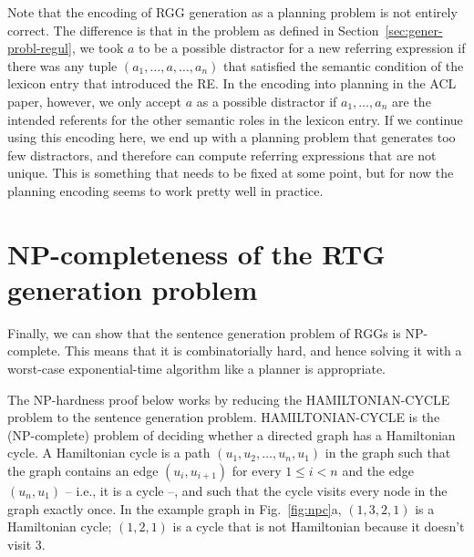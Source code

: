 \documentclass[11pt,a4]{article}
\theoremstyle{plain}
\theoremstyle{definition}
\begin{document}
Note that the encoding of RGG generation as a planning problem is not
entirely correct.  The difference is that in the problem as defined in
Section~\ref{sec:gener-probl-regul}, we took $a$ to be a possible
distractor for a new referring expression if there was any tuple
$(a_1,\ldots,a,\ldots,a_n)$ that satisfied the semantic condition of
the lexicon entry that introduced the RE.  In the encoding into
planning in the ACL paper, however, we only accept $a$ as a possible
distractor if $a_1,\ldots,a_n$ are the intended referents for the
other semantic roles in the lexicon entry. If we continue using this
encoding here, we end up with a planning problem that generates too
few distractors, and therefore can compute referring expressions that
are not unique. This is something that needs to be fixed at some
point, but for now the planning encoding seems to work pretty well in
practice.


\section{NP-completeness of the RTG generation problem}
\label{sec:np-completeness}

Finally, we can show that the sentence generation problem of RGGs is
NP-complete. This means that it is combinatorially hard, and hence
solving it with a worst-case exponential-time algorithm like a planner
is appropriate.

The NP-hardness proof below works by reducing the HAMILTONIAN-CYCLE
problem \cite{garey79:_comput_and_intrac} to the sentence generation
problem. HAMILTONIAN-CYCLE is the (NP-complete) problem of deciding
whether a directed graph has a Hamiltonian cycle.  A Hamiltonian cycle
is a path $(u_1,u_2,\ldots,u_n,u_1)$ in the graph such that the graph
contains an edge $(u_i,u_{i+1})$ for every $1 \leq i <n$ and the edge
$(u_n,u_1)$ -- i.e., it is a cycle --, and such that the cycle visits
every node in the graph exactly once. In the example graph in
Fig.~\ref{fig:npc}a, $(1,3,2,1)$ is a Hamiltonian cycle; $(1,2,1)$ is
a cycle that is not Hamiltonian because it doesn't visit 3.
\end{document}
